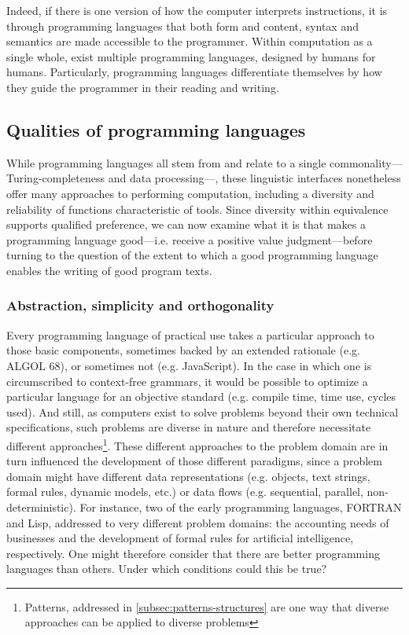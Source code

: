 Indeed, if there is one version of how the computer interprets instructions, it is through programming languages that both form and content, syntax and semantics are made accessible to the programmer. Within computation as a single whole, exist multiple programming languages, designed by humans for humans. Particularly, programming languages differentiate themselves by how they guide the programmer in their reading and writing.

\subsection{Qualities of programming languages}
\label{subsec:qualities-programming-languages}

While programming languages all stem from and relate to a single commonality—Turing-completeness and data processing—, these linguistic interfaces nonetheless offer many approaches to performing computation, including a diversity and reliability of functions characteristic of tools. Since diversity within equivalence supports qualified preference, we can now examine what it is that makes a programming language good—i.e. receive a positive value judgment—before turning to the question of the extent to which a good programming language enables the writing of good program texts.

\subsubsection{Abstraction, simplicity and orthogonality}
\label{subsubsec:abstraction-simplicity-orthogonality}

Every programming language of practical use takes a particular approach to those basic components, sometimes backed by an extended rationale (e.g. ALGOL 68), or sometimes not (e.g. JavaScript). In the case in which one is circumscribed to context-free grammars, it would be possible to optimize a particular language for an objective standard (e.g. compile time, time use, cycles used). And still, as computers exist to solve problems beyond their own technical specifications, such problems are diverse in nature and therefore necessitate different approaches\footnote{Patterns, addressed in \ref{subsec:patterns-structures} are one way that diverse approaches can be applied to diverse problems}. These different approaches to the problem domain are in turn influenced the development of those different paradigms, since a problem domain might have different data representations (e.g. objects, text strings, formal rules, dynamic models, etc.) or data flows (e.g. sequential, parallel, non-deterministic). For instance, two of the early programming languages, FORTRAN and Lisp, addressed to very different problem domains: the accounting needs of businesses and the development of formal rules for artificial intelligence, respectively. One might therefore consider that there are better programming languages than others. Under which conditions could this be true?


